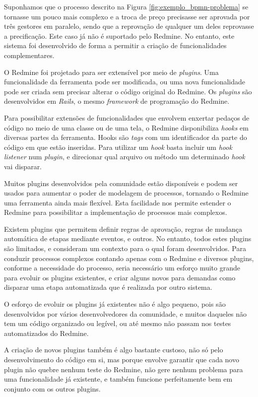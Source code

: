 Suponhamos que o processo descrito na Figura \ref{fig:exemplo_bpmn-problema} se tornasse um pouco mais complexo e a troca de preço precisasse ser aprovada por três gestores em paralelo, sendo que a reprovação de qualquer um deles reprovasse a precificação. Este caso já não é suportado pelo Redmine. No entanto, este sistema foi desenvolvido de forma a permitir a criação de funcionalidades complementares.

O Redmine foi projetado para ser extensível por meio de \textit{plugins}. Uma funcionalidade da ferramenta pode ser modificada, ou uma nova funcionalidade pode ser criada sem precisar alterar o código original do Redmine. Os \textit{plugins} são desenvolvidos em \textit{Rails}, o mesmo \textit{framework} de programação do Redmine. 

Para possibilitar extensões de funcionalidades que envolvem enxertar pedaços de código no meio de uma classe ou de uma tela, o Redmine disponibiliza \textit{hooks} em diversas partes da ferramenta. Hooks são \textit{tags} com um identificador da parte do código em que estão inseridas. Para utilizar um \textit{hook} basta incluir um \textit{hook} \textit{listener} num \textit{plugin}, e direcionar qual arquivo ou método um determinado \textit{hook} vai disparar.

Muitos plugins desenvolvidos pela comunidade estão disponíveis e podem ser usados para aumentar o poder de modelagem de processos, tornando o Redmine uma ferramenta ainda mais flexível. Esta facilidade nos permite estender o Redmine para possibilitar a implementação de processos mais complexos.

Existem plugins que permitem definir regras de aprovação, regras de mudança automática de etapas mediante eventos, e outros. No entanto, todos estes plugins são limitados, e consideram um contexto para o qual foram desenvolvidos. Para conduzir processos complexos contando apenas com o Redmine e diversos plugins, conforme a necessidade do processo, seria necessário um esforço muito grande para evoluir os plugins existentes, e criar alguns novos para demandas como disparar uma etapa automatizada que é realizada por outro sistema. 

O esforço de evoluir os plugins já existentes não é algo pequeno, pois são desenvolvidos por vários desenvolvedores da comunidade, e muitos daqueles não tem um código organizado ou legível, ou até mesmo não passam nos testes automatizados do Redmine.

A criação de novos plugins também é algo bastante custoso, não só pelo desenvolvimento do código em si, mas porque envolve garantir que cada novo plugin não quebre nenhum teste do Redmine, não gere nenhum problema para uma funcionalidade já existente, e também funcione perfeitamente bem em conjunto com os outros plugins.

